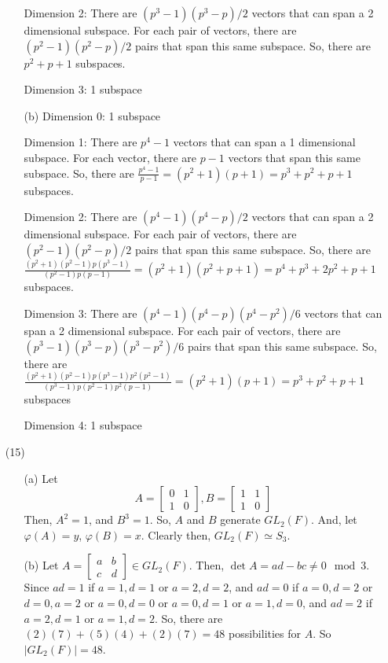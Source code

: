 \documentclass[12pt]{article}
\begin{document}
\begin{itemize}
\begin{itemize}
Dimension 2: There are $(p^3 - 1)(p^3 - p)/2$ vectors that can span a 2 dimensional subspace. For each pair of vectors, there are $(p^2 - 1)(p^2 - p)/2$ pairs that span this same subspace. So, there are $p^2 + p + 1$ subspaces.

Dimension 3: 1 subspace
\item[(b)]
Dimension 0: 1 subspace

Dimension 1: There are $p^4 - 1$ vectors that can span a 1 dimensional subspace. For each vector, there are $p - 1$ vectors that span this same subspace. So, there are $\frac{p^4 - 1}{p - 1} = (p^2 + 1)(p + 1) = p^3 + p^2 + p + 1$ subspaces.

Dimension 2: There are $(p^4 - 1)(p^4 - p)/2$ vectors that can span a 2 dimensional subspace. For each pair of vectors, there are $(p^2 - 1)(p^2 - p)/2$ pairs that span this same subspace. So, there are $\frac{(p^2 + 1)(p^2 - 1)p(p^3 - 1)}{(p^2 - 1)p(p - 1)} = (p^2 + 1)(p^2 + p + 1) = p^4 + p^3 + 2p^2 + p + 1$ subspaces.

Dimension 3: There are $(p^4 - 1)(p^4 - p)(p^4 - p^2)/6$ vectors that can span a 2 dimensional subspace. For each pair of vectors, there are $(p^3 - 1)(p^3 - p)(p^3 - p^2)/6$ pairs that span this same subspace. So, there are $\frac{(p^2 + 1)(p^2 - 1)p(p^3 - 1)p^2(p^2 - 1)}{(p^3 - 1)p(p^2 - 1)p^2(p-1)} = (p^2 + 1)(p + 1) = p^3 + p^2 + p + 1$ subspaces

Dimension 4: 1 subspace
\end{itemize}
\item[(15)]
\begin{itemize}
\item[(a)]
Let
$$A = \begin{bmatrix}
0 & 1 \\
1 & 0
\end{bmatrix}, B = \begin{bmatrix}
1 & 1 \\
1 & 0
\end{bmatrix}$$
Then, $A^2 = 1$, and $B^3 = 1$. So, $A$ and $B$ generate $GL_2(F)$. And, let $\varphi(A) = y$, $\varphi(B) = x$. Clearly then, $GL_2(F) \simeq S_3$.
\item[(b)]
Let $A = \begin{bmatrix}
a & b \\
c & d
\end{bmatrix} \in GL_2(F)$. Then, $\det A = ad - bc \neq 0 \mod 3$. Since $ad = 1$ if $a = 1, d = 1$ or $a = 2, d = 2$, and $ad = 0$ if $a = 0, d = 2$ or $d = 0, a = 2$ or $a = 0, d = 0$ or $a = 0, d = 1$ or $a = 1, d = 0$, and $ad = 2$ if $a = 2, d = 1$ or $a = 1, d = 2$. So, there are $(2)(7) + (5)(4) + (2)(7) = 48$ possibilities for $A$. So $|GL_2(F)| = 48$.


\end{itemize}
\end{itemize}
\end{document}
